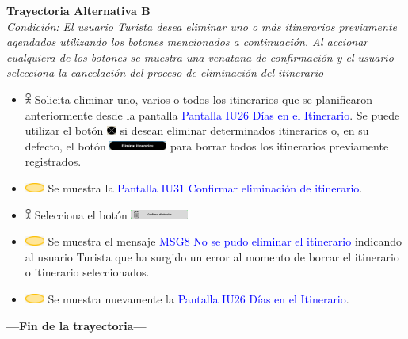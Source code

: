 \textbf{Trayectoria Alternativa B}\\
\textit{Condición: El usuario Turista desea eliminar uno o más itinerarios previamente agendados utilizando los botones mencionados a continuación. Al accionar cualquiera de los botones se muestra una venatana de confirmación y el usuario selecciona la cancelación del proceso de eliminación del itinerario}
\begin{itemize}
    \item \includegraphics[width=0.0150\textwidth]{Figuras/persona.png} Solicita eliminar uno, varios o todos los itinerarios que se planificaron anteriormente desde la pantalla {\textcolor{blue}{Pantalla IU26 Días en el Itinerario}}. Se puede utilizar el botón \includegraphics[width=0.0250\textwidth]{ComponentesCU/Eliminar.PNG} si desean eliminar determinados itinerarios o, en su defecto, el botón \includegraphics[width=0.150\textwidth]{ComponentesCU/EliminarItinerarios.PNG} para borrar todos los itinerarios previamente registrados.
    \item \includegraphics[width=0.0500\textwidth]{Figuras/sistema.png} Se muestra la {\textcolor{blue}{Pantalla IU31 Confirmar eliminación de itinerario}}.
    \item \includegraphics[width=0.0150\textwidth]{Figuras/persona.png} Selecciona el botón \includegraphics[width=0.1500\textwidth]{ComponentesCU/img2.png}
    \item \includegraphics[width=0.0500\textwidth]{Figuras/sistema.png} Se muestra el mensaje {\textcolor{blue}{MSG8 No se pudo eliminar el itinerario}} indicando al usuario Turista que ha surgido un error al momento de borrar el itinerario o itinerario seleccionados.
    \item \includegraphics[width=0.0500\textwidth]{Figuras/sistema.png} Se muestra nuevamente la {\textcolor{blue}{Pantalla IU26 Días en el Itinerario}}.
\end{itemize}
\textbf{---Fin de la trayectoria---}

